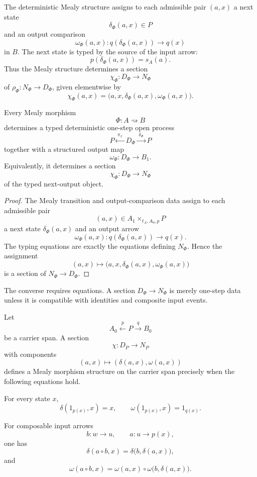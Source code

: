 The deterministic Mealy structure assigns to each admissible pair \((a,x)\) a next state
\[
\delta_\Phi(a,x)\in P
\]
and an output comparison
\[
\omega_\Phi(a,x):q(\delta_\Phi(a,x))\to q(x)
\]
in \(B\).  The next state is typed by the source of the input arrow:
\[
p(\delta_\Phi(a,x))=s_A(a).
\]
Thus the Mealy structure determines a section
\[
\chi_\Phi:D_\Phi\to N_\Phi
\]
of \(\rho_\Phi:N_\Phi\to D_\Phi\), given elementwise by
\[
\chi_\Phi(a,x)
=
\bigl(a,x,\delta_\Phi(a,x),\omega_\Phi(a,x)\bigr).
\]

\begin{proposition}
\label{prop:one-step-process-presentation}
Every Mealy morphism
\[
\Phi:A\rightsquigarrow B
\]
determines a typed deterministic one-step open process
\[
P
\xleftarrow{\;\pi_x\;}
D_\Phi
\xrightarrow{\;\delta_\Phi\;}
P
\]
together with a structured output map
\[
\omega_\Phi:D_\Phi\to B_1.
\]
Equivalently, it determines a section
\[
\chi_\Phi:D_\Phi\to N_\Phi
\]
of the typed next-output object.
\end{proposition}

\begin{proof}
The Mealy transition and output-comparison data assign to each admissible pair
\[
(a,x)\in A_1\times_{t_A,A_0,p}P
\]
a next state \(\delta_\Phi(a,x)\) and an output arrow
\[
\omega_\Phi(a,x):q(\delta_\Phi(a,x))\to q(x).
\]
The typing equations are exactly the equations defining \(N_\Phi\).  Hence the assignment
\[
(a,x)\mapsto
\bigl(a,x,\delta_\Phi(a,x),\omega_\Phi(a,x)\bigr)
\]
is a section of \(N_\Phi\to D_\Phi\).
\end{proof}

The converse requires equations.  A section \(D_\Phi\to N_\Phi\) is merely one-step data unless it
is compatible with identities and composite input events.

\begin{proposition}
\label{prop:mealy-laws-process-form}
Let
\[
A_0\xleftarrow{p}P\xrightarrow{q}B_0
\]
be a carrier span.  A section
\[
\chi:D_P\to N_P
\]
with components
\[
(a,x)\longmapsto(\delta(a,x),\omega(a,x))
\]
defines a Mealy morphism structure on the carrier span precisely when the following equations hold.

For every state \(x\),
\[
\delta(1_{p(x)},x)=x,
\qquad
\omega(1_{p(x)},x)=1_{q(x)}.
\]

For composable input arrows
\[
b:w\to u,
\qquad
a:u\to p(x),
\]
one has
\[
\delta(a\circ b,x)
=
\delta\bigl(b,\delta(a,x)\bigr),
\]
and
\[
\omega(a\circ b,x)
=
\omega(a,x)\circ
\omega\bigl(b,\delta(a,x)\bigr).
\]
\end{proposition}

